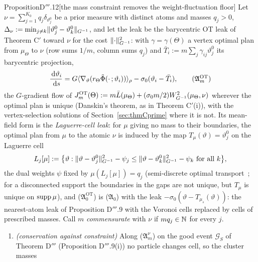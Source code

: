 \begin{thm}{Proposition}{D$'''$.12}[the mass constraint removes the weight-fluctuation floor]
Let $\nu = \sum_{j=1}^{K_0}q_j\delta_{\vartheta^0_j}$ be a prior measure with distinct atoms and masses $q_j > 0$,
$\Delta_\nu := \min_{j\ne k}\lVert \vartheta^0_j - \vartheta^0_k\rVert_{G^{-1}}$, and let the leak be the barycentric OT leak
of Theorem C$'$ toward $\nu$ for the cost $\lVert \cdot\rVert^2_{G^{-1}}$: with $\gamma = \gamma(\Theta)$ a vertex optimal
plan from $\mu_\Theta$ to $\nu$ (row sums $1/m$, column sums $q_j$) and $\bar T_i := m\sum_j\gamma_{ij}\vartheta^0_j$
its barycentric projection,
\begin{equation}
  \frac{\dd\vartheta_i}{\dd s} = G\langle\nabla_\vartheta(r_\Theta\tilde\Phi(\cdot\,;\vartheta_i))\rangle_\rho
  - \sigma_0(\vartheta_i - \bar T_i),
  \tag{$\mathfrak{A}_m^{\mathrm{OT}}$}
\end{equation}
the $G$-gradient flow of $J_m^{\mathrm{OT}}(\Theta) := m\bar L(\mu_\Theta) + (\sigma_0m/2)W^2_{G^{-1}}(\mu_\Theta,\nu)$
wherever the optimal plan is unique (Danskin's theorem, as in Theorem C$'$(i)), with the vertex-selection solutions
of Section~\ref{sec:thmCprime} where it is not. Its mean-field form is the \emph{Laguerre-cell leak}: for $\mu$
giving no mass to their boundaries, the optimal plan from $\mu$ to the atomic $\nu$ is induced by the map
$T_\mu(\vartheta) = \vartheta^0_j$ on the Laguerre cell
\[
  L_j[\mu] := \bigl\{\vartheta : \lVert \vartheta - \vartheta^0_j\rVert^2_{G^{-1}} - \psi_j
  \le\lVert \vartheta - \vartheta^0_k\rVert^2_{G^{-1}} - \psi_k\text{ for all }k\bigr\},
\]
the dual weights $\psi$ fixed by $\mu(L_j[\mu]) = q_j$ (semi-discrete optimal transport~\cite{S42}; for a
disconnected support the boundaries in the gaps are not unique, but $T_\mu$ is unique on $\operatorname{supp}\mu$), and
\textup{($\mathfrak{A}_0^{\mathrm{OT}}$)} is \textup{($\mathfrak{A}_0$)} with the leak
$-\sigma_0(\vartheta - T_{\mu_s}(\vartheta))$: the nearest-atom leak of Proposition D$'''$.9 with the Voronoi cells
replaced by cells of prescribed masses. Call $m$ \emph{commensurate} with $\nu$ if $mq_j\in\mathbb{N}$ for every $j$.
\begin{enumerate}[label=\textup{(\roman*)}]
  \item \emph{(conservation against constraint)} Along \textup{($\mathfrak{A}_m^\nu$)} on the good event
    $\mathcal{G}_S$ of Theorem D$'''$ (Proposition D$'''$.9(i)) no particle changes cell, so the cluster masses

\end{enumerate}
\end{thm}
